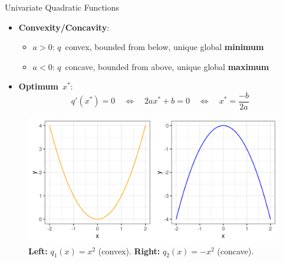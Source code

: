 \documentclass[11pt,compress,t,notes=noshow, xcolor=table]{beamer}
\begin{document}
\begin{vbframe}{Univariate Quadratic Functions}
\begin{itemize}
    \framebreak
    
    \item \textbf{Convexity/Concavity}:
        \begin{itemize}
            \setlength{\itemindent}{-0.5cm}
            \item $a > 0$: $q$~convex, bounded from below, unique global \textbf{minimum}
            \item $a < 0$: $q$~concave, bounded from above, unique global \textbf{maximum}
        \end{itemize}
    
    \item \textbf{Optimum}~$x^\ast$:
        \vspace{-0.5\baselineskip}
        \begin{equation*}
            q'(x^\ast) = 0 \quad\Leftrightarrow \quad 2ax^\ast + b = 0 \quad \Leftrightarrow \quad x^\ast = \frac{-b}{2a}  	
        \end{equation*}
\end{itemize}

\vspace{-0.5\baselineskip}

\begin{figure}
    \centering
    \includegraphics[height=0.3\textwidth, keepaspectratio]{figure_man/quadratic_functions_1D.png}
    \caption*{\textbf{Left:} $q_1(x) = x^2$ (convex).
        \textbf{Right:} $q_2(x) = - x^2$ (concave).}
\end{figure}

\end{vbframe}
  
\end{document}
